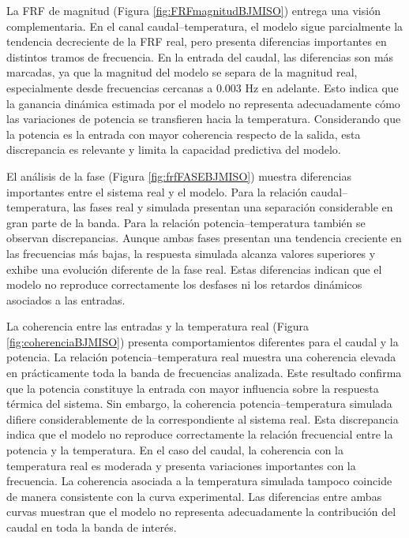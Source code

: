 \documentclass[11pt]{report}
\begin{document}
La FRF de magnitud (Figura \ref{fig:FRFmagnitudBJMISO}) entrega una visión complementaria. En el canal caudal–temperatura, el modelo sigue parcialmente la tendencia decreciente de la FRF real, pero presenta diferencias importantes en distintos tramos de frecuencia. En la entrada del caudal, las diferencias son más marcadas, ya que la magnitud del modelo se separa de la magnitud real, especialmente desde frecuencias cercanas a 0.003 Hz en adelante. Esto indica que la ganancia dinámica estimada por el modelo no representa adecuadamente cómo las variaciones de potencia se transfieren hacia la temperatura. Considerando que la potencia es la entrada con mayor coherencia respecto de la salida, esta discrepancia es relevante y limita la capacidad predictiva del modelo.

El análisis de la fase (Figura \ref{fig:frfFASEBJMISO}) muestra diferencias importantes entre el sistema real y el modelo. Para la relación caudal–temperatura, las fases real y simulada presentan una separación considerable en gran parte de la banda. Para la relación potencia–temperatura también se observan discrepancias. Aunque ambas fases presentan una tendencia creciente en las frecuencias más bajas, la respuesta simulada alcanza valores superiores y exhibe una evolución diferente de la fase real. Estas diferencias indican que el modelo no reproduce correctamente los desfases ni los retardos dinámicos asociados a las entradas.




La coherencia entre las entradas y la temperatura real (Figura \ref{fig:coherenciaBJMISO}) presenta comportamientos diferentes para el caudal y la potencia. La relación potencia–temperatura real muestra una coherencia elevada en prácticamente toda la banda de frecuencias analizada. Este resultado confirma que la potencia constituye la entrada con mayor influencia sobre la respuesta térmica del sistema. Sin embargo, la coherencia potencia–temperatura simulada difiere considerablemente de la correspondiente al sistema real. Esta discrepancia indica que el modelo no reproduce correctamente la relación frecuencial entre la potencia y la temperatura. En el caso del caudal, la coherencia con la temperatura real es moderada y presenta variaciones importantes con la frecuencia. La coherencia asociada a la temperatura simulada tampoco coincide de manera consistente con la curva experimental. Las diferencias entre ambas curvas muestran que el modelo no representa adecuadamente la contribución del caudal en toda la banda de interés.
\end{document}
